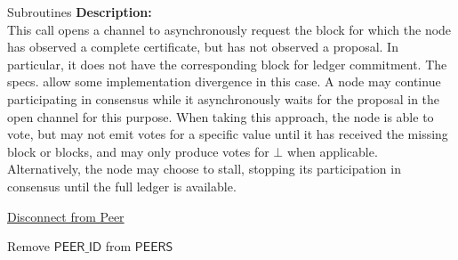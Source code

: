 \documentclass[10pt,a4paper]{article}
\begin{document}
\begin{section}{Subroutines}
\noindent \textbf{Description:} \\
This call opens a channel to asynchronously request the block for which the node has
observed a complete certificate, but has not observed a proposal. In particular, it does not
have the corresponding block for ledger commitment.
The specs. allow some implementation divergence in this case.
A node may continue participating in consensus while it asynchronously waits for the proposal
in the open channel for this purpose. When taking this approach, the node is able to vote, but may
not emit votes for a specific value until it has received the missing block or blocks, and may only produce
votes for $\bot$ when applicable.
Alternatively, the node may choose to stall, stopping its participation in consensus until the full ledger is available.




\begin{algorithm}[H]
    \caption{\underline{Disconnect from Peer}}
    \label{algo:disconnect-peer}
    \begin{algorithmic}[1]
        \State Remove $\mathsf{PEER\_ID}$ from $\mathsf{PEERS}$
    \EndFunction
    \end{algorithmic}
\end{algorithm}




\end{section}
\end{document}
